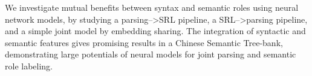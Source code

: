 We investigate mutual benefits between syntax  and  semantic  roles  using neural network models, by studying a parsing-->SRL pipeline, a SRL-->parsing pipeline,  and a  simple  joint model by embedding  sharing. The integration of syntactic and semantic features gives promising results in a Chinese Semantic Tree-bank, demonstrating large potentials of neural models for joint parsing and semantic role labeling.
